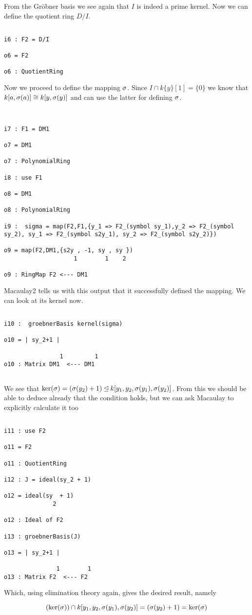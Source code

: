 From the Gr\"{o}bner basis we see again that $I$ is indeed a prime kernel.
Now we can define the quotient ring $D/I$.

\begin{lstlisting}

i6 : F2 = D/I

o6 = F2

o6 : QuotientRing

\end{lstlisting}

Now we proceed to define the mapping $\sigma$. Since $I \cap k\{y\}[1] = \{ 0 \}$ 
we know that $k[a,\sigma(a)] \cong k[y,\sigma(y)]$ and can use the latter for defining $\sigma$.

\begin{lstlisting}


i7 : F1 = DM1

o7 = DM1

o7 : PolynomialRing

i8 : use F1

o8 = DM1

o8 : PolynomialRing

i9 :  sigma = map(F2,F1,{y_1 => F2_(symbol sy_1),y_2 => F2_(symbol sy_2), sy_1 => F2_(symbol s2y_1), sy_2 => F2_(symbol s2y_2)})

o9 = map(F2,DM1,{s2y , -1, sy , sy })
                    1        1    2

o9 : RingMap F2 <--- DM1

\end{lstlisting}

Macaulay2 tells us with this output that it successfully defined the mapping. We can look at its kernel now.

\begin{lstlisting}

i10 :  groebnerBasis kernel(sigma)

o10 = | sy_2+1 |

                1         1
o10 : Matrix DM1  <--- DM1


\end{lstlisting}


We see that $\ker(\sigma) = (\sigma(y_2) + 1) \unlhd k[y_1,y_2, \sigma(y_1), \sigma(y_2)]$. 
From this we should be able to deduce already that the condition holds, but we can ask Macaulay to explicitly
calculate it too

\begin{lstlisting}

i11 : use F2

o11 = F2

o11 : QuotientRing

i12 : J = ideal(sy_2 + 1)

o12 = ideal(sy  + 1)
              2

o12 : Ideal of F2

i13 : groebnerBasis(J)

o13 = | sy_2+1 |

               1        1
o13 : Matrix F2  <--- F2

\end{lstlisting}
 
Which, using elimination theory again, gives the desired result, namely

$$ (\ker(\sigma)) \cap k[y_1,y_2,\sigma(y_1),\sigma(y_2)] = (\sigma(y_2) +1) = \ker(\sigma) $$
